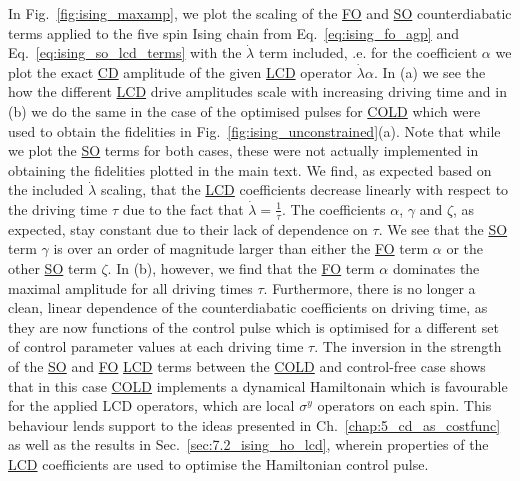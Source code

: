 \documentclass[a4paper,oneside,11pt]{book}
\newcommand{\sy}{\sigma^y}
\newcommand{\dotlambda}{\dot{\lambda}}
\newcommand{\acrref}[1]{\hyperref[acr:#1]{#1}}
\begin{document}
In Fig.~\ref{fig:ising_maxamp}, we plot the scaling of the \acrref{FO} and \acrref{SO} counterdiabatic terms applied to the five spin Ising chain from Eq.~\eqref{eq:ising_fo_agp} and Eq.~\eqref{eq:ising_so_lcd_terms} with the $\dotlambda$ term included, \@i.e. for the coefficient $\alpha$ we plot the exact \acrref{CD} amplitude of the given \acrref{LCD} operator $\dotlambda \alpha$. In (a) we see the how the different \acrref{LCD} drive amplitudes scale with increasing driving time and in (b) we do the same in the case of the optimised pulses for \acrref{COLD} which were used to obtain the fidelities in Fig.~\ref{fig:ising_unconstrained}(a). Note that while we plot the \acrref{SO} terms for both cases, these were not actually implemented in obtaining the fidelities plotted in the main text. We find, as expected based on the included $\dotlambda$ scaling, that the \acrref{LCD} coefficients decrease linearly with respect to the driving time $\tau$ due to the fact that $\dotlambda = \frac{1}{\tau}$. The coefficients $\alpha$, $\gamma$ and $\zeta$, as expected, stay constant due to their lack of dependence on $\tau$. We see that the \acrref{SO} term $\gamma$ is over an order of magnitude larger than either the \acrref{FO} term $\alpha$ or the other \acrref{SO} term $\zeta$. In (b), however, we find that the \acrref{FO} term $\alpha$ dominates the maximal amplitude for all driving times $\tau$. Furthermore, there is no longer a clean, linear dependence of the counterdiabatic coefficients on driving time, as they are now functions of the control pulse which is optimised for a different set of control parameter values at each driving time $\tau$. The inversion in the strength of the \acrref{SO} and \acrref{FO} \acrref{LCD} terms between the \acrref{COLD} and control-free case shows that in this case \acrref{COLD} implements a dynamical Hamiltonain which is favourable for the applied LCD operators, which are local $\sy$ operators on each spin. This behaviour lends support to the ideas presented in Ch.~\ref{chap:5_cd_as_costfunc} as well as the results in Sec.~\ref{sec:7.2_ising_ho_lcd}, wherein properties of the \acrref{LCD} coefficients are used to optimise the Hamiltonian control pulse.
\end{document}
